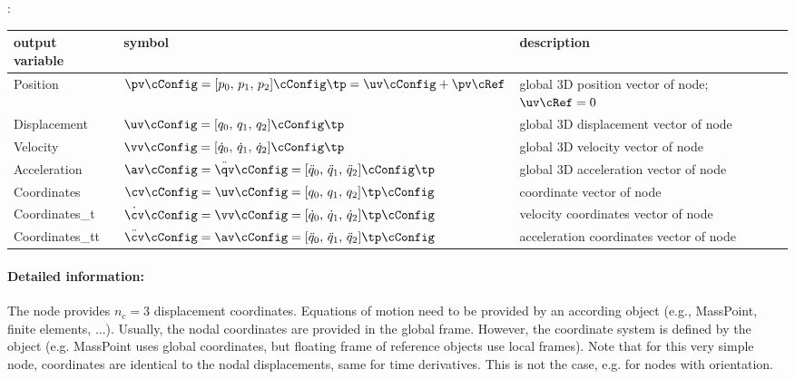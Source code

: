:
\begin{center}
\footnotesize
\begin{longtable}{| p{5cm} | p{5cm} | p{6cm} |} 
\hline
\bf output variable & \bf symbol & \bf description \\ \hline
Position & $\pv\cConfig = [p_0,\,p_1,\,p_2]\cConfig\tp= \uv\cConfig + \pv\cRef$ & global 3D position vector of node; $\uv\cRef=0$\\ \hline
Displacement & $\uv\cConfig = [q_0,\,q_1,\,q_2]\cConfig\tp$ & global 3D displacement vector of node\\ \hline
Velocity & $\vv\cConfig = [\dot q_0,\,\dot q_1,\,\dot q_2]\cConfig\tp$ & global 3D velocity vector of node\\ \hline
Acceleration & $\av\cConfig = \ddot \qv\cConfig = [\ddot q_0,\,\ddot q_1,\,\ddot q_2]\cConfig\tp$ & global 3D acceleration vector of node\\ \hline
Coordinates & $\cv\cConfig = \uv\cConfig = [q_0,\,q_1,\,q_2]\tp\cConfig$ &  coordinate vector of node\\ \hline
Coordinates\_t & $\dot\cv\cConfig = \vv\cConfig = [\dot q_0,\,\dot q_1,\,\dot q_2]\tp\cConfig$ &  velocity coordinates vector of node\\ \hline
Coordinates\_tt & $\ddot\cv\cConfig = \av\cConfig = [\ddot q_0,\,\ddot q_1,\,\ddot q_2]\tp\cConfig$ &  acceleration coordinates vector of node\\ \hline
\end{longtable}
\end{center}
 \noindent
    \paragraph{Detailed information:}
    The node provides $n_c=3$ displacement coordinates. Equations of motion need to be provided by an according object (e.g., MassPoint, finite elements, ...).
    Usually, the nodal coordinates are provided in the global frame. However, the coordinate system is defined by the object (e.g. MassPoint uses global coordinates, but floating frame of reference objects use local frames).
    Note that for this very simple node, coordinates are identical to the nodal displacements, same for time derivatives. This is not the case, e.g. for nodes with orientation. \vspace{6pt}\\

